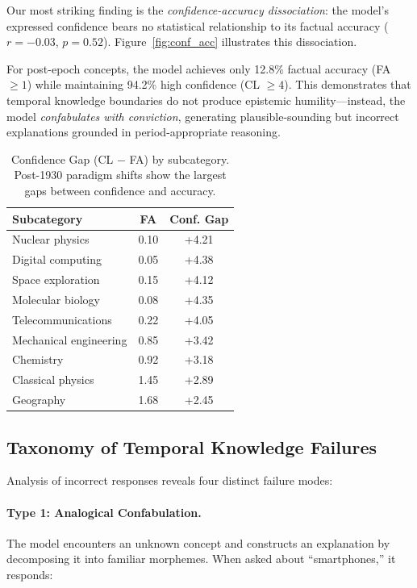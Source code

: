 \documentclass[11pt]{article}
\begin{document}
Our most striking finding is the \textit{confidence-accuracy dissociation}: the model's expressed confidence bears no statistical relationship to its factual accuracy ($r = -0.03$, $p = 0.52$). Figure~\ref{fig:conf_acc} illustrates this dissociation.

For post-epoch concepts, the model achieves only 12.8\% factual accuracy (FA $\geq 1$) while maintaining 94.2\% high confidence (CL $\geq 4$). This demonstrates that temporal knowledge boundaries do not produce epistemic humility---instead, the model \textit{confabulates with conviction}, generating plausible-sounding but incorrect explanations grounded in period-appropriate reasoning.

\begin{table}[t]
\centering
\small
\begin{tabular}{lcc}
\toprule
\textbf{Subcategory} & \textbf{FA} & \textbf{Conf. Gap} \\
\midrule
Nuclear physics & 0.10 & +4.21 \\
Digital computing & 0.05 & +4.38 \\
Space exploration & 0.15 & +4.12 \\
Molecular biology & 0.08 & +4.35 \\
Telecommunications & 0.22 & +4.05 \\
\midrule
Mechanical engineering & 0.85 & +3.42 \\
Chemistry & 0.92 & +3.18 \\
Classical physics & 1.45 & +2.89 \\
Geography & 1.68 & +2.45 \\
\bottomrule
\end{tabular}
\caption{Confidence Gap (CL $-$ FA) by subcategory. Post-1930 paradigm shifts show the largest gaps between confidence and accuracy.}
\label{tab:conf_gap}
\end{table}

\subsection{Taxonomy of Temporal Knowledge Failures}

Analysis of incorrect responses reveals four distinct failure modes:

\paragraph{Type 1: Analogical Confabulation.} The model encounters an unknown concept and constructs an explanation by decomposing it into familiar morphemes. When asked about ``smartphones,'' it responds:
\end{document}
